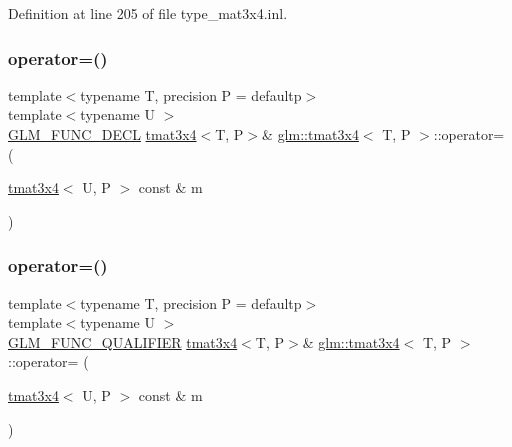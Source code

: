 Definition at line 205 of file type\+\_\+mat3x4.\+inl.

\mbox{\label{structglm_1_1tmat3x4_a966fd086e06ed72bed9db6e362ac5cd4}} 
\subsubsection{\texorpdfstring{operator=()}{operator=()}\hspace{0.1cm}{\footnotesize\ttfamily [2/3]}}
{\footnotesize\ttfamily template$<$typename T, precision P = defaultp$>$ \\
template$<$typename U $>$ \\
\mbox{\hyperlink{setup_8hpp_ab2d052de21a70539923e9bcbf6e83a51}{G\+L\+M\+\_\+\+F\+U\+N\+C\+\_\+\+D\+E\+CL}} \mbox{\hyperlink{structglm_1_1tmat3x4}{tmat3x4}}$<$T, P$>$\& \mbox{\hyperlink{structglm_1_1tmat3x4}{glm\+::tmat3x4}}$<$ T, P $>$\+::operator= (\begin{DoxyParamCaption}\item[{\mbox{\hyperlink{structglm_1_1tmat3x4}{tmat3x4}}$<$ U, P $>$ const \&}]{m }\end{DoxyParamCaption})}

\mbox{\label{structglm_1_1tmat3x4_a819a25fbfbbf505d7304adec59824063}} 
\subsubsection{\texorpdfstring{operator=()}{operator=()}\hspace{0.1cm}{\footnotesize\ttfamily [3/3]}}
{\footnotesize\ttfamily template$<$typename T, precision P = defaultp$>$ \\
template$<$typename U $>$ \\
\mbox{\hyperlink{setup_8hpp_a33fdea6f91c5f834105f7415e2a64407}{G\+L\+M\+\_\+\+F\+U\+N\+C\+\_\+\+Q\+U\+A\+L\+I\+F\+I\+ER}} \mbox{\hyperlink{structglm_1_1tmat3x4}{tmat3x4}}$<$T, P$>$\& \mbox{\hyperlink{structglm_1_1tmat3x4}{glm\+::tmat3x4}}$<$ T, P $>$\+::operator= (\begin{DoxyParamCaption}\item[{\mbox{\hyperlink{structglm_1_1tmat3x4}{tmat3x4}}$<$ U, P $>$ const \&}]{m }\end{DoxyParamCaption})}



